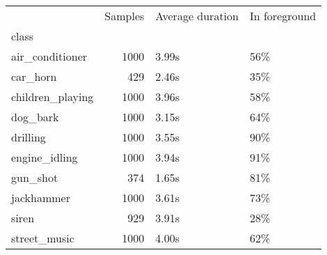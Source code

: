 \begin{tabular}{lrll}
\toprule
{} &  Samples & Average duration & In foreground \\
class            &          &                  &               \\
\midrule
air\_conditioner  &     1000 &            3.99s &           56\% \\
car\_horn         &      429 &            2.46s &           35\% \\
children\_playing &     1000 &            3.96s &           58\% \\
dog\_bark         &     1000 &            3.15s &           64\% \\
drilling         &     1000 &            3.55s &           90\% \\
engine\_idling    &     1000 &            3.94s &           91\% \\
gun\_shot         &      374 &            1.65s &           81\% \\
jackhammer       &     1000 &            3.61s &           73\% \\
siren            &      929 &            3.91s &           28\% \\
street\_music     &     1000 &            4.00s &           62\% \\
\bottomrule
\end{tabular}
